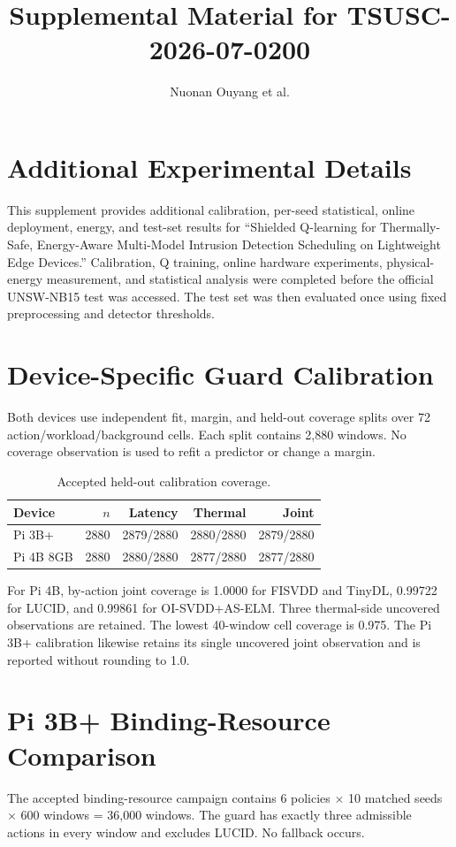 \documentclass[10pt,journal]{IEEEtran}
\title{Supplemental Material for TSUSC-2026-07-0200}
\author{Nuonan Ouyang et al.}
\begin{document}
\maketitle

\section{Additional Experimental Details}
This supplement provides additional calibration, per-seed statistical, online deployment, energy, and test-set results for ``Shielded Q-learning for Thermally-Safe, Energy-Aware Multi-Model Intrusion Detection Scheduling on Lightweight Edge Devices.'' Calibration, Q training, online hardware experiments, physical-energy measurement, and statistical analysis were completed before the official UNSW-NB15 test was accessed. The test set was then evaluated once using fixed preprocessing and detector thresholds.

\section{Device-Specific Guard Calibration}
Both devices use independent fit, margin, and held-out coverage splits over 72 action/workload/background cells. Each split contains 2,880 windows. No coverage observation is used to refit a predictor or change a margin.

\begin{table}[h]
\caption{Accepted held-out calibration coverage.}
\centering\footnotesize
\begin{tabular}{lrrrr}
\toprule
Device & $n$ & Latency & Thermal & Joint \\
\midrule
Pi 3B+ & 2880 & 2879/2880 & 2880/2880 & 2879/2880 \\
Pi 4B 8GB & 2880 & 2880/2880 & 2877/2880 & 2877/2880 \\
\bottomrule
\end{tabular}
\end{table}

For Pi 4B, by-action joint coverage is 1.0000 for FISVDD and TinyDL, 0.99722 for LUCID, and 0.99861 for OI-SVDD+AS-ELM. Three thermal-side uncovered observations are retained. The lowest 40-window cell coverage is 0.975. The Pi 3B+ calibration likewise retains its single uncovered joint observation and is reported without rounding to 1.0.

\section{Pi 3B+ Binding-Resource Comparison}
The accepted binding-resource campaign contains 6 policies $\times$ 10 matched seeds $\times$ 600 windows = 36,000 windows. The guard has exactly three admissible actions in every window and excludes LUCID. No fallback occurs.
\end{document}

